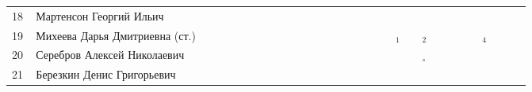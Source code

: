 \documentclass[a4paper,landscape,11pt]{article}
\newcommand*\OK{&\small \ding{51}$\!\!_\circ$} %
\newcommand*\ok{&{\small \ding{51}}} %
\newcommand*\no{&{\small }} %
\newcommand*\da{&{\small\ding{48}$\!\!_1$}} %
\newcommand*\db{&{\small\ding{48}$\!\!_2$}} %
\newcommand*\dd{&{\small\ding{48}$\!\!_4$}} %
\begin{document}
\begin{tabular}{p{7pt}|l|p{6pt}p{6pt}p{6pt}p{6pt}p{6pt}p{6pt}p{6pt}p{6pt}p{6pt}p{6pt}p{6pt}p{6pt}p{6pt}p{6pt}p{6pt}p{6pt}p{6pt}p{6pt}p{6pt}p{6pt}p{6pt}p{6pt}p{6pt}p{6pt}p{6pt}p{6pt}p{6pt}p{6pt}}
18\,&Мартенсон Георгий Ильич            \ok\ok\ok\ok\ok\ok\ok\ok\ok\ok\ok\ok\ok\ok\ok\ok\ok\ok\no\no \no\no\no    \no\no\\
19\,&Михеева Дарья Дмитриевна (ст.)     \ok\ok\ok\ok\ok\ok\ok\ok\ok\ok\ok\ok\ok\ok\ok\ok\ok\da\ok\db \ok\ok\no    \ok\dd\ok\ok\ok\\
20\,&Серебров Алексей Николаевич        \ok\ok\ok\ok\ok\ok\no\ok\ok\ok\ok\ok\ok\ok\ok\ok\ok\ok\ok\OK \no\no\no    \no\no\ok\ok\ok\\
21\,&Березкин Денис Григорьевич         \no\no\no\no\ok\ok\no\no\no\no\ok\ok\no\no\no\no\no\no\no\no \no\no\no    \no\no\ok\ok\no\\
\bottomrule
\end{tabular} 
\newpage
%
\hspace{-6cm}
\end{document}
